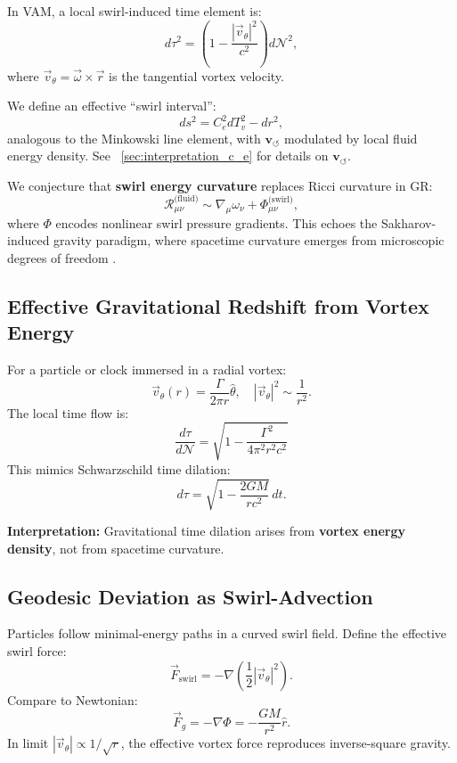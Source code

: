 \documentclass[12pt]{article}
\begin{document}
    In VAM, a local swirl-induced time element is:
    \[
        d\tau^2 = \left(1 - \frac{|\vec{v}_\theta|^2}{c^2} \right) d\mathcal{N}^2,
    \]
    where \( \vec{v}_\theta = \vec{\omega} \times \vec{r} \) is the tangential vortex velocity.

    We define an effective “swirl interval”:
    \[
        ds^2 = C_e^2 dT_v^2 - dr^2,
    \]
    analogous to the Minkowski line element, with \( \mathbf{v}_{\scriptscriptstyle\boldsymbol{\circlearrowleft}} \) modulated by local fluid energy density. See ~\ref{sec:interpretation_c_e} for details on \( \mathbf{v}_{\scriptscriptstyle\boldsymbol{\circlearrowleft}} \).

    We conjecture that \textbf{swirl energy curvature} replaces Ricci curvature in GR:
    \[
        \mathcal{R}_{\mu\nu}^{\text{(fluid)}} \sim \nabla_\mu \omega_\nu + \Phi_{\mu\nu}^{\text{(swirl)}},
    \]
    where \( \Phi \) encodes nonlinear swirl pressure gradients.
This echoes the Sakharov-induced gravity paradigm, where spacetime curvature emerges from microscopic degrees of freedom \cite{sakharov1967vacuum}.


    \subsection*{Effective Gravitational Redshift from Vortex Energy}

    For a particle or clock immersed in a radial vortex:
    \[
        \vec{v}_\theta(r) = \frac{\Gamma}{2\pi r} \hat{\theta}, \quad |\vec{v}_\theta|^2 \sim \frac{1}{r^2}.
    \]
    The local time flow is:
    \begin{equation}
        \boxed{
            \frac{d\tau}{d\mathcal{N}} = \sqrt{1 - \frac{\Gamma^2}{4\pi^2 r^2 c^2}}
        }
        \label{eq:gravitational-redshift}
    \end{equation}
    This mimics Schwarzschild time dilation:
    \[
        d\tau = \sqrt{1 - \frac{2GM}{rc^2}} \, dt.
    \]

    \textbf{Interpretation:} Gravitational time dilation arises from \textbf{vortex energy density}, not from spacetime curvature.

    \subsection*{Geodesic Deviation as Swirl-Advection}

    Particles follow minimal-energy paths in a curved swirl field. Define the effective swirl force:
    \[
        \vec{F}_{\text{swirl}} = -\nabla \left( \frac{1}{2} |\vec{v}_\theta|^2 \right).
    \]
    Compare to Newtonian:
    \[
        \vec{F}_g = -\nabla \Phi = -\frac{GM}{r^2} \hat{r}.
    \]
    In limit \( |\vec{v}_\theta| \propto 1/\sqrt{r} \), the effective vortex force reproduces inverse-square gravity.
\end{document}
